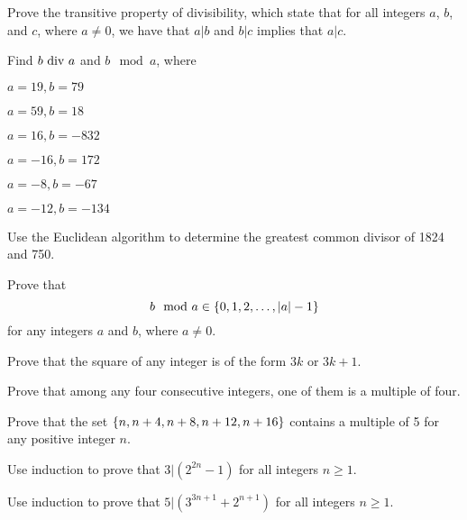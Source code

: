 \documentclass[12pt]{article}
\begin{document}
\begin{qu}
Prove the transitive property of divisibility, which state that for all integers $a$, $b$, and $c$, where $a\ne 0$, we have that $a|b$ and $b|c$ implies that $a |c$.
\end{qu}

\begin{qu}
Find $b \textrm{ div } a$ and $b \mod a$, where \\
\begin{inparaenum}[a)]
\item $a=19, b=79$
\tab\item  $a=59, b=18$
\tab\item $a=16, b=-832$
\tab\item $a=-16, b=172$
\tab\item $a=-8, b=-67$
\tab\item $a=-12, b=-134$
\end{inparaenum}
\end{qu}

\begin{qu}
Use the Euclidean algorithm to determine the greatest common divisor of 1824 and 750.
\end{qu}

\begin{qu}
Prove that 
$$b \mod a \in \left\{0, 1, 2, \dots , |a|-1 \right\}$$
for any integers $a$ and $b$, where $a \ne 0$.
\end{qu}

\begin{qu}
Prove that the square of any integer is of the form $3k$ or $3k+1$.
\end{qu}

\begin{qu}
Prove that among any four consecutive integers, one of them is a multiple of four.
\end{qu}

\begin{qu}
Prove that the set $\left\{n, n+4, n+8, n+12, n+16\right\}$ contains a multiple of 5 for any positive integer $n$.
\end{qu}

\begin{qu}
Use induction to prove that $3 | (2^{2n}-1)$ for all integers $n \geq 1$.
\end{qu}

\begin{qu}
Use induction to prove that $5 | (3^{3n+1}+2^{n+1})$ for all integers $n \geq 1$.
\end{qu}
\end{document}
